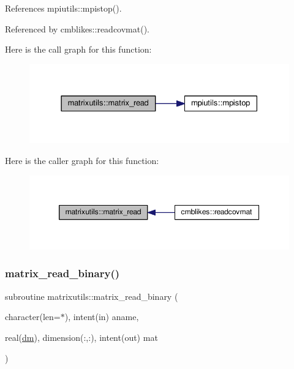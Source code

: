 References mpiutils\+::mpistop().



Referenced by cmblikes\+::readcovmat().

Here is the call graph for this function\+:
\nopagebreak
\begin{figure}[H]
\begin{center}
\leavevmode
\includegraphics[width=328pt]{namespacematrixutils_ac778ea47bab010c70f3d6f00838e4668_cgraph}
\end{center}
\end{figure}
Here is the caller graph for this function\+:
\nopagebreak
\begin{figure}[H]
\begin{center}
\leavevmode
\includegraphics[width=350pt]{namespacematrixutils_ac778ea47bab010c70f3d6f00838e4668_icgraph}
\end{center}
\end{figure}
\mbox{\label{namespacematrixutils_a311afaea7a3204cc1b47a2adb7bebe63}} 
\subsubsection{\texorpdfstring{matrix\+\_\+read\+\_\+binary()}{matrix\_read\_binary()}}
{\footnotesize\ttfamily subroutine matrixutils\+::matrix\+\_\+read\+\_\+binary (\begin{DoxyParamCaption}\item[{character(len=$\ast$), intent(in)}]{aname,  }\item[{real(\mbox{\hyperlink{namespacematrixutils_a7bdc564986ea4d90f51201c75606ef3d}{dm}}), dimension(\+:,\+:), intent(out)}]{mat }\end{DoxyParamCaption})}

